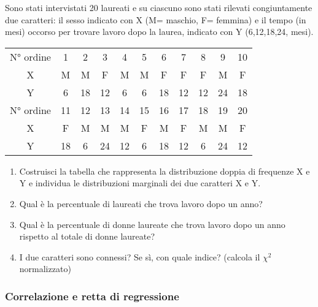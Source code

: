 \begin{esercizio}
\label{ese:c_stat_006}
Sono stati intervistati 20 laureati e su ciascuno sono stati rilevati 
congiuntamente due caratteri: il sesso indicato con X (M= maschio, F= 
femmina) e il tempo (in mesi) occorso per trovare lavoro dopo la laurea, 
indicato con Y (6,12,18,24, mesi).
\begin{center}
\begin{tabular}{ccccccccccc}
\toprule
N° ordine & 1 & 2 & 3 & 4 & 5 & 6 & 7 & 8 & 9 & 10 \\
X & M & M & F & M & M & F & F & F & M & F \\
Y & 6 & 18 & 12 & 6 & 6& 18 & 12 & 12 & 24 & 18\\
\midrule
N° ordine & 11 & 12 & 13 & 14 & 15 & 16 & 17 & 18 & 19 & 20 \\
X & F & M & M & M & F & M & F & M & M & F\\
Y & 18 & 6 & 24 & 12 & 6 & 18 & 12 & 6 &24 & 12\\
\bottomrule
\end{tabular}
\end{center}

\begin{enumerate}
\item Costruisci la tabella che rappresenta la distribuzione doppia 
di frequenze X e Y e individua le distribuzioni marginali dei due 
caratteri X e Y.
\item Qual è la percentuale di laureati che trova lavoro dopo un anno?
\item Qual è la percentuale di donne laureate che trova lavoro dopo 
un anno rispetto al totale di donne laureate?
\item I due caratteri sono connessi? Se sì, con quale indice? 
(calcola il $\chi^2$ normalizzato)
\end{enumerate}
\end{esercizio}

\subsubsection{Correlazione e retta di regressione}

